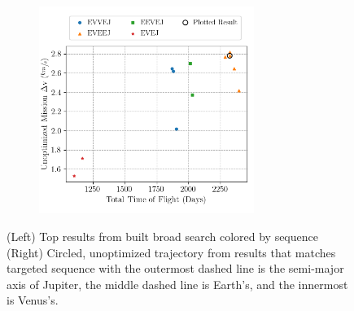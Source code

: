 \documentclass[letterpaper, preprint, paper,11pt]{AAS}	%
\begin{document}
\begin{figure}[htb]
    \begin{subfigure}
        \centering\includegraphics[width=2.75in]{./fig/galileoResults.png}
    \end{subfigure}
    \begin{subfigure}
        \centering
    \end{subfigure}
    \caption{(Left) Top results from built broad search colored by sequence\hspace{1em} (Right) Circled, unoptimized trajectory from results that matches targeted sequence \cite{DAmario1992} with the outermost dashed line is the semi-major axis of Jupiter, the middle dashed line is Earth's, and the innermost is Venus's.}
    \label{fig:galiResults}
\end{figure}
\end{document}
